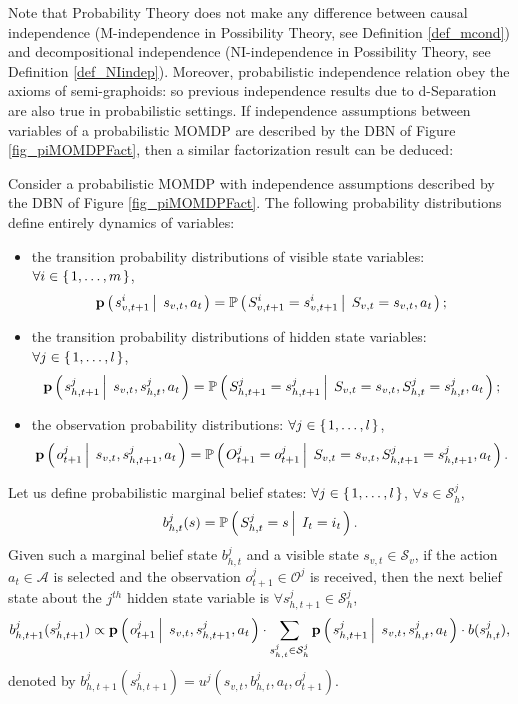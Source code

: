 Note that Probability Theory does not make any difference between 
causal independence (M-independence in Possibility Theory, see Definition \ref{def_mcond}) 
and decompositional independence (NI-independence in Possibility Theory, see Definition \ref{def_NIindep}).
Moreover, probabilistic independence relation obey the axioms of semi-graphoids:
so previous independence results due to d-Separation are also true in probabilistic settings. 
If independence assumptions between variables of a probabilistic MOMDP \cite{OngShaoHsuWee-IJRR10,AraThoBufCha-ICTAI10} are described 
by the DBN of Figure \ref{fig_piMOMDPFact},
then a similar factorization result can be deduced:
\begin{theorem}
\label{thm_factoredPROBbelief}
Consider a probabilistic MOMDP with independence assumptions described by the DBN of Figure \ref{fig_piMOMDPFact}.
The following probability distributions define entirely dynamics of variables:
\begin{itemize}
\item the transition probability distributions of visible state variables: 
$\forall i \in \left\{ \left. 1,\ldots,m \right. \right\}$, 
\[ \textbf{p} \left( \left.  s^i_{v,t+1} \, \right| \left. \, s_{v,t}, a_t  \right. \right) = \mathbb{P} \left( \left.  S^i_{v,t+1} = s^i_{v,t+1} \, \right| \left. \, S_{v,t} = s_{v,t}, a_t   \right. \right); \]	
\item the transition probability distributions of hidden state variables:
$\forall j \in \left\{ \left. 1,\ldots,l \right. \right\}$,
\[ \textbf{p} \left( \left.  s^j_{h,t+1} \, \right| \left. \, s_{v,t}, s^j_{h,t}, a_t  \right. \right) = \mathbb{P} \left( \left.  S^j_{h,t+1} = s^j_{h,t+1} \, \right| \left. \, S_{v,t} = s_{v,t}, S^j_{h,t} =  s^j_{h,t}, a_t   \right. \right); \]
\item the observation probability distributions:
$\forall j \in \left\{ \left. 1,\ldots,l \right. \right\}$,
\[ \textbf{p} \left( \left.  o^j_{t+1} \, \right| \left. \, s_{v,t}, s^j_{h,t+1}, a_t  \right. \right) = \mathbb{P} \left( \left.  O^j_{t+1} = o^j_{t+1} \, \right| \left. \, S_{v,t} = s_{v,t}, S^j_{h,t+1} =  s^j_{h,t+1}, a_t   \right. \right). \]
\end{itemize}
Let us define probabilistic marginal belief states:
$\forall j \in \left\{ \left. 1,\ldots,l \right. \right\}$, $\forall s \in \mathcal{S}^j_h$, 
\[ b^j_{h,t}(s) = \mathbb{P} \left( \left.  S^j_{h,t} = s \, \right| \left. \, I_t = i_t \right. \right).\]
Given such a marginal belief state $b^j_{h,t}$
and a visible state $s_{v,t} \in \mathcal{S}_v$, 
if the action $a_t \in \mathcal{A}$ is selected
and the observation $o^j_{t+1} \in \mathcal{O}^j$
is received, 
then the next belief state about the $j^{th}$ hidden state variable is
$\forall s^j_{h,t+1} \in \mathcal{S}^j_h$, 
\[ b^j_{h,t+1}(s^j_{h,t+1}) \propto \textbf{p} \left( \left.  o^j_{t+1} \, \right| \left. \, s_{v,t}, s^j_{h,t+1}, a_t  \right. \right) \cdot 
\sum_{s^j_{h,t} \in \mathcal{S}_h^j} \textbf{p} \left( \left.  s^j_{h,t+1} \, \right| \left. \, s_{v,t}, s^j_{h,t}, a_t  \right. \right) \cdot b(s^j_{h,t}), \]
denoted by $b^j_{h,t+1}(s^j_{h,t+1}) = u^j(s_{v,t},b^j_{h,t},a_t,o^j_{t+1})$.


\end{theorem}
